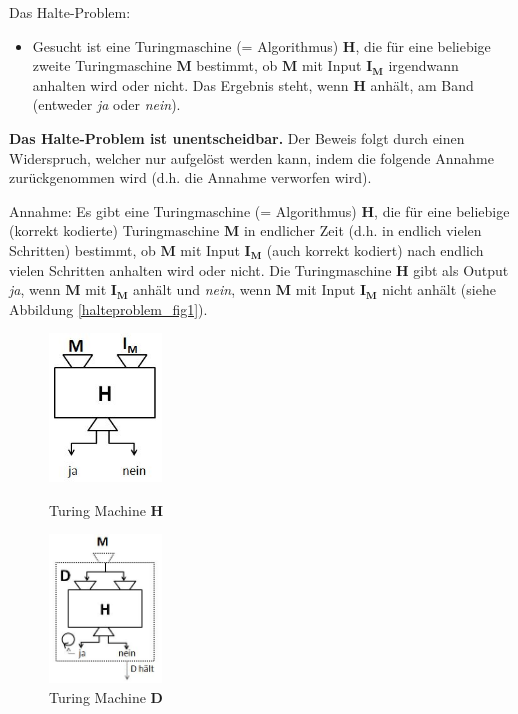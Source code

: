 Das Halte-Problem:
\begin{itemize}
  \item Gesucht ist eine Turingmaschine (= Algorithmus) $\mathbf{H}$, die für eine beliebige zweite Turingmaschine $\mathbf{M}$ bestimmt, ob $\mathbf{M}$ mit Input $\mathbf{I_M}$ irgendwann anhalten wird oder nicht. Das Ergebnis steht, wenn $\mathbf{H}$ anhält, am Band (entweder \emph{ja} oder \emph{nein}).
\end{itemize}

{\bf Das Halte-Problem ist unentscheidbar.} Der Beweis folgt durch einen Widerspruch, welcher nur aufgelöst werden kann, indem die folgende Annahme zurückgenommen wird (d.h. die Annahme verworfen wird).\newline

Annahme: Es gibt eine Turingmaschine (= Algorithmus) $\mathbf{H}$, die für eine beliebige (korrekt kodierte) Turingmaschine $\mathbf{M}$ in endlicher Zeit (d.h. in endlich vielen Schritten) bestimmt, ob $\mathbf{M}$ mit Input $\mathbf{I_M}$ (auch korrekt kodiert) nach endlich vielen Schritten anhalten wird oder nicht. Die Turingmaschine $\mathbf{H}$ gibt als Output \emph{ja}, wenn $\mathbf{M}$ mit $\mathbf{I_M}$ anhält und \emph{nein}, wenn $\mathbf{M}$ mit Input $\mathbf{I_M}$ nicht anhält (siehe Abbildung \ref{halteproblem_fig1}). \newline

\begin{figure}[h]
\begin{minipage}[h]{0.475\textwidth}
\centering
\includegraphics[width=3cm]{img/haltingproblem1.jpg}
    \caption{Turing Machine $\mathbf{H}$}
    \label{halteproblem_fig1}
\end{minipage}
%
\begin{minipage}[h]{0.475\textwidth}
\centering
\includegraphics[width=3cm]{img/haltingproblem2.jpg}
    \caption{Turing Machine $\mathbf{D}$}
    \label{halteproblem_fig2}
\end{minipage}
\end{figure}


